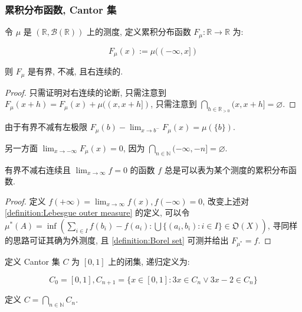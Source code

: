 \subsubsection{累积分布函数, Cantor 集}

\begin{definition}[累积分布函数]
    \label {definition:cumulative distribution function}
    令 \(\mu\) 是 \((\mathbb{R},\mathcal{B} (\mathbb{R}))\) 上的测度, 定义累积分布函数 \(F_\mu : \mathbb{R} \to \mathbb{R}\) 为:

    \[
        F_\mu (x) := \mu((-\infty,x])
    \]

    则 \(F_\mu\) 是有界, 不减, 且右连续的.

    \begin{proof}
        只需证明对右连续的论断, 只需注意到 \(F_\mu (x+h) = F_\mu (x) + \mu((x,x+h])\), 只需注意到 \(\bigcap_{h \in \mathbb{R}_{>0}} (x,x+h] = \varnothing\).
    \end{proof}
\end{definition}

\begin{remark}
    由于有界不减有左极限 \(F_\mu(b) - \lim_{x \to b^{-}} F_\mu (x) = \mu(\{b\})\).

    另一方面 \(\lim_{x \to -\infty} F_\mu (x) = 0\), 因为 \(\bigcap_{n \in \mathbb{N}} (-\infty,-n] = \varnothing\).
\end{remark}

\begin{lemma}
    有界不减右连续且 \(\lim_{x \to \infty} f = 0\) 的函数 \(f\) 总是可以表为某个测度的累积分布函数.

    \begin{proof}
        定义 \(f(+\infty) = \lim_{x \to \infty} f(x), f(-\infty) = 0\), 改变上述对 \ref{definition:Lebesgue outer measure} 的定义,
        可以令 \(\mu^\ast (A) = \inf (\sum_{i \in I} f(b_i) - f(a_i): \bigcup \{(a_i, b_i): i \in I\} \in \mathfrak{O} (X))\),
        寻同样的思路可证其确为外测度, 且 \ref{definition:Borel set} 可测并给出 \(F_{\mu^\ast} = f\). 
    \end{proof}
\end{lemma}

\begin{definition}[Cantor 集]
    \label {definition:Cantor set}
    定义 Cantor 集 \(C\) 为 \([0,1]\) 上的闭集, 递归定义为:

    \[
        C_0 = [0,1], C_{n+1} = \{x \in [0,1]:3x \in C_{n} \lor 3x - 2 \in C_{n}\}
    \]

    定义 \(C = \bigcap_{n \in \mathbb{N}} C_n\).
\end{definition}

